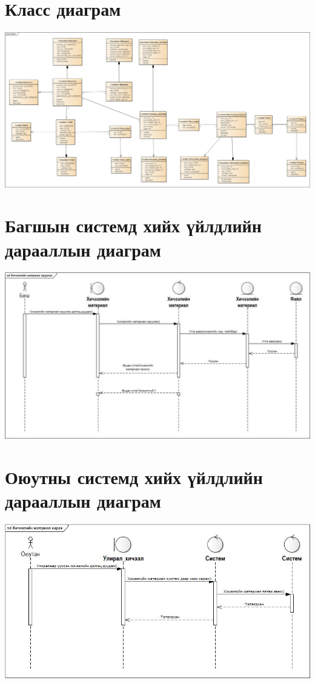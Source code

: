 \documentclass[12pt]{article}
\begin{document}
	\section{Класс диаграм}
		\includegraphics[scale=0.5]{Class} 
		
	\section{Багшын системд хийх үйлдлийн дарааллын диаграм}
		\includegraphics[scale=0.4]{sequence1}
		
	\section{Оюутны системд хийх үйлдлийн дарааллын диаграм}
		\includegraphics[scale=0.4]{sequence2}
	
	
	
\end{document}
